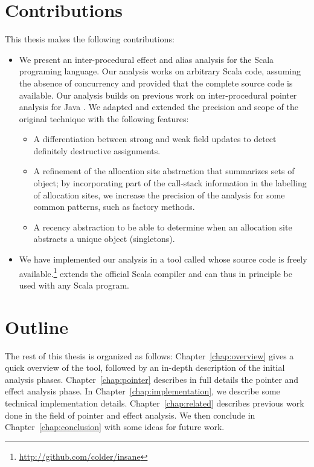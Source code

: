 \section{Contributions}
This thesis makes the following contributions:
\begin{itemize}
    \item
    We present an inter-procedural effect and alias analysis for the Scala
programing language. Our analysis works on arbitrary Scala code, assuming the
absence of concurrency and provided that the complete source code is available.
Our analysis builds on previous work on inter-procedural pointer analysis for
Java \cite{Salcianu2006}. 
We adapted and extended the precision and scope of the original technique with the following features:
    \begin{itemize}
        \item A differentiation between strong and weak field updates to detect
definitely destructive assignments.
        \item A refinement of the allocation
site\cite{DBLP:conf/pldi/ChaseWZ90} abstraction that summarizes sets of object;
by incorporating part of the call-stack information in the labelling of
allocation sites, we increase the precision of the analysis for some common
patterns, such as factory methods.
        \item A recency abstraction to be able to determine when an allocation
site abstracts a unique object (singletons).
    \end{itemize}

    \item We have implemented our analysis in a tool called {\insane} whose
source code is freely
available.\footnote{\url{http://github.com/colder/insane}} {\insane} extends
the official Scala compiler and can thus in principle be used with any Scala
program.
\end{itemize}

\section{Outline}
The rest of this thesis is organized as follows: Chapter~\ref{chap:overview}
gives a quick overview of the tool, followed by an in-depth description of the
initial analysis phases. Chapter~\ref{chap:pointer} describes in full details
the pointer and effect analysis phase. In Chapter~\ref{chap:implementation},
we describe some technical implementation details. Chapter~\ref{chap:related}
describes previous work done in the field of pointer and effect analysis. We
then conclude in Chapter~\ref{chap:conclusion} with some ideas for future work.
